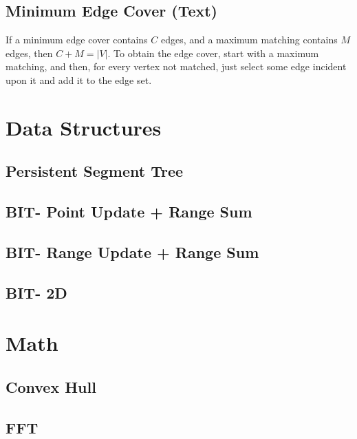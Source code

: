 \documentclass[12pt]{extarticle}
\begin{document}
\begin{multicols*}{2}
\subsection{Minimum Edge Cover (Text)} %
If a minimum edge cover contains $C$ edges, and a maximum matching contains $M$
edges, then $C + M = |V|$. To obtain the edge cover, start with a maximum
matching, and then, for every vertex not matched, just select some edge
incident upon it and add it to the edge set. 


\section{Data Structures}

\subsection{Persistent Segment Tree} %


\subsection{BIT- Point Update + Range Sum} %


\subsection{BIT- Range Update + Range Sum} %


\subsection{BIT- 2D} %



\section{Math}

\subsection{Convex Hull} %


\subsection{FFT} %



\end{multicols*}
\end{document}
